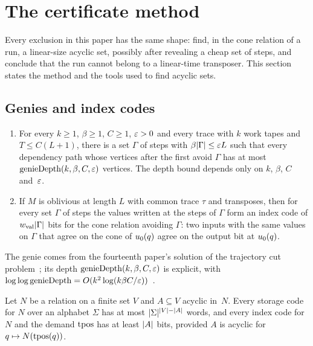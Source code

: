 \section{The certificate method}\label{sec:certificates}

Every exclusion in this paper has the same shape: find, in the cone relation of a run, a linear-size acyclic set, possibly after
revealing a cheap set of steps, and conclude that the run cannot belong to a linear-time transposer. This section states the
method and the tools used to find acyclic sets.

\subsection{Genies and index codes}

\begin{lemma}\label{lem:genie}
\begin{enumerate}[label=(\alph*)]
\item For every $k\ge1$, $\beta\ge1$, $C\ge1$, $\varepsilon>0$ and every trace with $k$ work tapes and $T\le C(L+1)$, there is a set $\Gamma$
of steps with $\beta\lvert \Gamma \rvert\le\varepsilon L$ such that every dependency path whose vertices after the first avoid $\Gamma$ has at most
$\mathrm{genieDepth}(k,\beta,C,\varepsilon)$ vertices. The depth bound depends only on $k$, $\beta$, $C$ and~$\varepsilon$.
\item If $M$ is oblivious at length $L$ with common trace $\tau$ and transposes, then for every set $\Gamma$ of steps the values
written at the steps of $\Gamma$ form an index code of $w_{\mathrm{val}}\lvert \Gamma \rvert$ bits for the cone relation avoiding $\Gamma$: two inputs
with the same values on $\Gamma$ that agree on the cone of $u_0(q)$ agree on the output bit at $u_0(q)$.
\end{enumerate}
\end{lemma}

The genie comes from the fourteenth paper's solution of the trajectory cut problem~\cite[Theorem~T]{BoundedStack2026}; its depth
$\mathrm{genieDepth}(k,\beta,C,\varepsilon)$ is explicit, with $\log\log\mathrm{genieDepth}=O(k^2\log(k\beta C/\varepsilon))$~\cite[Remark~9.4 and
\S10]{BoundedStack2026}.

\begin{lemma}\label{lem:acyclic-code}
Let $N$ be a relation on a finite set $V$ and $A\subseteq V$ acyclic in~$N$. Every storage code for $N$ over an alphabet $\Sigma$ has
at most $\lvert \Sigma \rvert^{\lvert V \rvert-\lvert A \rvert}$ words, and every index code for $N$ and the demand $\mathrm{tpos}$ has at least $\lvert A \rvert$ bits, provided
$A$ is acyclic for $q\mapsto N(\mathrm{tpos}(q))$.
\end{lemma}

